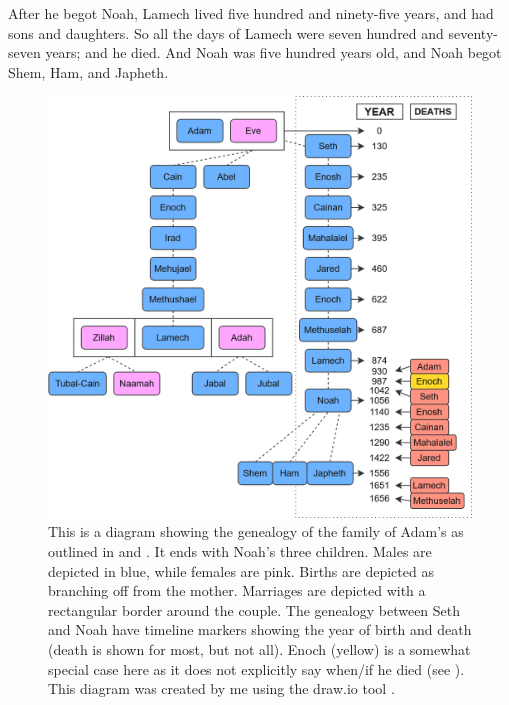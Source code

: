 \bverse After he begot Noah, Lamech lived five hundred and ninety-five years, and had sons and daughters.
\bverse So all the days of Lamech were seven hundred and seventy-seven years; and he died.
\bverse And Noah was five hundred years old, and Noah begot Shem, Ham, and Japheth.




\begin{figure}[htbp] %
  \centering
  \includegraphics[width=\linewidth]{images/genealogies/adams_genealogy.png}
  \caption{This is a diagram showing the genealogy of the family of Adam's as outlined in  and . It ends with Noah's three children. Males are depicted in blue, while females are pink. Births are depicted as branching off from the mother. Marriages are depicted with a rectangular border around the couple. The genealogy between Seth and Noah have timeline markers showing the year of birth and death (death is shown for most, but not all). Enoch (yellow) is a somewhat special case here as it does not explicitly say when/if he died (see ). This diagram was created by me using the draw.io tool \cite{draw.io}.}
  \label{fig:adams_genealogy}
\end{figure}